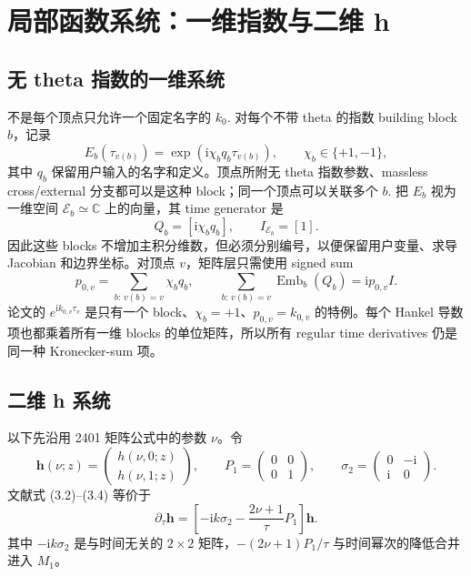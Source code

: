 \documentclass[11pt,a4paper]{ctexart}
\newcommand{\ii}{\mathrm i}
\newcommand{\cE}{\mathcal E}
\newcommand{\Emb}{\operatorname{Emb}}
\begin{document}
\section{局部函数系统：一维指数与二维 h}
\label{sec:local-function-system}

\subsection{无 theta 指数的一维系统}

不是每个顶点只允许一个固定名字的 $k_0$. 对每个不带 theta 的指数 building block $b$，记录
\begin{equation}
 E_b(\tau_{v(b)})
 =\exp\!\left(\ii\chi_bq_b\tau_{v(b)}\right),
 \qquad \chi_b\in\{+1,-1\},
 \label{eq:phase-exponent-block}
\end{equation}
其中 $q_b$ 保留用户输入的名字和定义。顶点所附无 theta 指数参数、massless cross/external 分支都可以是这种 block；同一个顶点可以关联多个 $b$. 把 $E_b$ 视为一维空间 $\cE_b\simeq\mathbb C$ 上的向量，其 time generator 是
\begin{equation}
 Q_b=[\ii\chi_bq_b],
 \qquad I_{\cE_b}=[1].
 \label{eq:exponential-1d}
\end{equation}
因此这些 blocks 不增加主积分维数，但必须分别编号，以便保留用户变量、求导 Jacobian 和边界坐标。对顶点 $v$，矩阵层只需使用 signed sum
\begin{equation}
 p_{0,v}=\sum_{b:\,v(b)=v}\chi_bq_b,
 \qquad
 \sum_{b:\,v(b)=v}\Emb_b(Q_b)=\ii p_{0,v}I.
 \label{eq:vertex-signed-phase-energy}
\end{equation}
论文的 $e^{\ii k_{0,v}\tau_v}$ 是只有一个 block、$\chi_b=+1$、$p_{0,v}=k_{0,v}$ 的特例。每个 Hankel 导数项也都乘着所有一维 blocks 的单位矩阵，所以所有 regular time derivatives 仍是同一种 Kronecker-sum 项。

\subsection{二维 h 系统}

以下先沿用 2401 矩阵公式中的参数 $\nu$。令
\begin{equation}
 \bm h(\nu;z)=
 \begin{pmatrix}h(\nu,0;z)\\h(\nu,1;z)\end{pmatrix},
 \qquad
 P_1=\begin{pmatrix}0&0\\0&1\end{pmatrix},
 \qquad
 \sigma_2=\begin{pmatrix}0&-\ii\\ \ii&0\end{pmatrix}.
\end{equation}
文献式 (3.2)--(3.4) 等价于
\begin{equation}
 \partial_\tau\bm h
 =\left[-\ii k\sigma_2-\frac{2\nu+1}{\tau}P_1\right]\bm h.
 \label{eq:h-first-order-system}
\end{equation}
其中 $-\ii k\sigma_2$ 是与时间无关的 $2\times2$ 矩阵，$-(2\nu+1)P_1/\tau$ 与时间幂次的降低合并进入 $M_1$。
\end{document}
